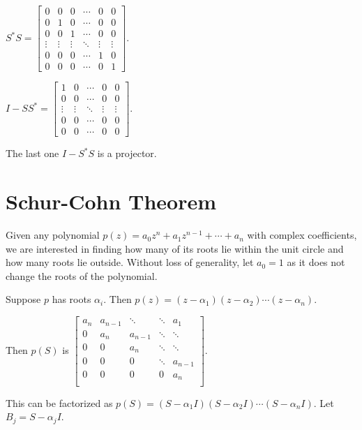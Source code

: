 \documentclass[twofold]{article}
\newcommand*\adj[1]{#1^*}
\theoremstyle{plain}
\theoremstyle{definition}
\theoremstyle{remark}
\begin{document}
 \(\adj{S} S  =  \begin{bmatrix} 
0 & 0 & 0 & \cdots & 0 & 0 \\
0 & 1 & 0 & \cdots & 0 & 0 \\
0 & 0 & 1 & \cdots & 0 & 0 \\
\vdots & \vdots & \vdots & \ddots &\vdots & \vdots \\
0 & 0 & 0 & \cdots & 1 & 0 \\ 
0 & 0 & 0 & \cdots & 0 & 1
\end{bmatrix}\). 

 \(I - S \adj{S} =  \begin{bmatrix} 
1 & 0 & \cdots & 0 & 0 \\
0 & 0 & \cdots & 0 & 0 \\
\vdots & \vdots & \ddots &\vdots & \vdots \\
0 & 0 & \cdots & 0 & 0 \\ 
0 & 0 & \cdots & 0 & 0
\end{bmatrix}\). 

The last one \(I - \adj{S} S\) is a projector. 


\section{Schur-Cohn Theorem}

Given any polynomial \(p(z) = a_0 z^n + a_1z^{n-1} + \cdots + a_n\) with complex coefficients, we are interested in finding how many of its roots lie within the unit circle and how many roots lie outside. Without loss of generality, let \(a_0 = 1\) as it does not change the roots of the polynomial. 

Suppose \(p\) has roots \(\alpha_i\). Then \(p(z) = (z - \alpha_1) (z - \alpha_2) \cdots (z - \alpha_n)\). 

 Then \(p(S) \) is \( \begin{bmatrix} 

a_n & a_{n-1} & \ddots & \ddots & a_1 \\
0 & a_n & a_{n-1} & \ddots & \ddots \\
0 & 0 & a_n & \ddots & \ddots \\
0 & 0 & 0 &\ddots & a_{n-1} \\
0 & 0 & 0 & 0 & a_n \\ 
\end{bmatrix}\). 


This can be factorized as \(p(S) = (S - \alpha_1I) (S - \alpha_2 I) \cdots (S - \alpha_n I)\). Let \(B_j = S - \alpha_jI\).
\end{document}
